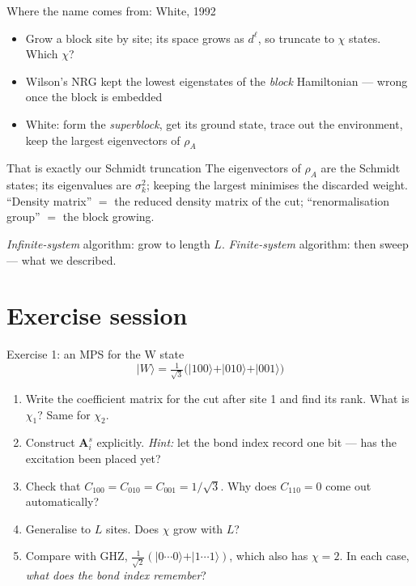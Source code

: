 \documentclass[aspectratio=169,10pt]{beamer}
\newcommand{\ket}[1]{\vert #1\rangle}
\newcommand{\Amat}[1]{\bm{A}^{#1}}
\begin{document}
\begin{frame}{Where the name comes from: White, 1992}
  \begin{itemize}
    \item Grow a block site by site; its space grows as $d^\ell$, so truncate to $\chi$ states. \alert{Which $\chi$?}
    \item Wilson's NRG kept the lowest eigenstates of the \emph{block} Hamiltonian --- wrong once the block is embedded
    \item White: form the \emph{superblock}, get its ground state, trace out the environment, keep the largest eigenvectors of $\rho_A$
  \end{itemize}
  \vspace{0.4em}
  \begin{block}{That is exactly our Schmidt truncation}
    The eigenvectors of $\rho_A$ are the Schmidt states; its eigenvalues are $\sigma_k^2$; keeping the largest minimises the discarded weight. ``Density matrix'' $=$ the reduced density matrix of the cut; ``renormalisation group'' $=$ the block growing.
  \end{block}
  \centering\small \emph{Infinite-system} algorithm: grow to length $L$. \emph{Finite-system} algorithm: then sweep --- what we described.
\end{frame}

\section{Exercise session}

\begin{frame}{Exercise 1: an MPS for the W state}
  \[
    \ket{W}=\tfrac1{\sqrt3}\bigl(\ket{100}+\ket{010}+\ket{001}\bigr)
  \]
  \begin{enumerate}
    \item Write the coefficient matrix for the cut after site 1 and find its rank. What is $\chi_1$? Same for $\chi_2$.
    \item Construct $\Amat{s}_i$ explicitly. \emph{Hint:} let the bond index record one bit --- \alert{has the excitation been placed yet?}
    \item Check that $C_{100}=C_{010}=C_{001}=1/\sqrt3$. Why does $C_{110}=0$ come out automatically?
    \item Generalise to $L$ sites. Does $\chi$ grow with $L$?
    \item Compare with GHZ, $\tfrac1{\sqrt2}(\ket{0\cdots0}+\ket{1\cdots1})$, which also has $\chi=2$. In each case, \emph{what does the bond index remember}?
  \end{enumerate}
\end{frame}
\end{document}
